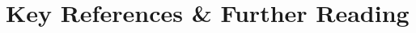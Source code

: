 \begin{figure*}
{\begin{tikzpicture}
	    \end{tikzpicture}
    }
    \caption{\todo}
    \label{figure:proofnet}
\end{figure*}


\section{Key References \& Further Reading}

